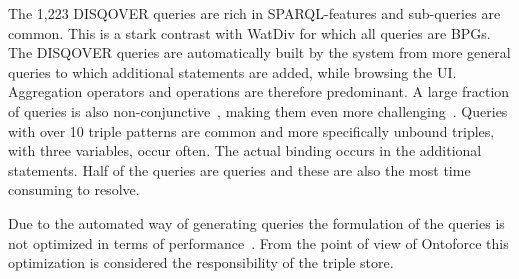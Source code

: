 The 1,223 DISQOVER queries are rich in SPARQL-features and sub-queries are common. This is a stark contrast with WatDiv for which all queries are BPGs.
The DISQOVER queries are automatically built by the system from more general queries to which additional  statements are added, while browsing the UI.
Aggregation operators and  operations are therefore predominant. A large fraction of queries is also non-conjunctive~\cite{conjunctive}, making them even more challenging~\cite{Picalausa2011}.
Queries with over 10 triple patterns are common and more specifically unbound triples, with three variables, occur often. The actual binding occurs in the additional  statements. Half of the queries are  queries and these are also the most time consuming to resolve. 

Due to the automated way of generating queries the formulation of the queries is not optimized in terms of performance~\cite{Groth}. From the point of view of Ontoforce this optimization is considered the responsibility of the triple store.